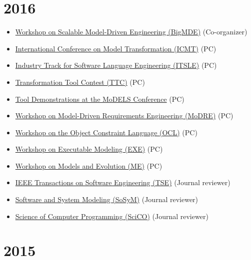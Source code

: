 \hypertarget{section-4}{%
\section{2016}\label{section-4}}

\begin{itemize}
\tightlist
\item
  \href{http://www.big-mde.eu/}{Workshop on Scalable Model-Driven
  Engineering (BigMDE)} (Co-organizer)
\item
  \href{http://is.ieis.tue.nl/research/ICMT16/}{International Conference
  on Model Transformation (ICMT)} (PC)
\item
  \href{http://2016.splashcon.org/track/itsle2016}{Industry Track for
  Software Language Engineering (ITSLE)} (PC)
\item
  \href{http://www.transformation-tool-contest.eu/}{Transformation Tool
  Contest (TTC)} (PC)
\item
  \href{http://models2016.irisa.fr/tool-demonstrations/}{Tool
  Demonstrations at the MoDELS Conference} (PC)
\item
  \href{http://www.modre2016.ece.mcgill.ca/}{Workshop on Model-Driven
  Requirements Engineering (MoDRE)} (PC)
\item
  \href{http://oclworkshop.github.io/2016/news.html}{Workshop on the
  Object Constraint Language (OCL)} (PC)
\item
  \href{http://www.modelexecution.org/?page_id=1743}{Workshop on
  Executable Modeling (EXE)} (PC)
\item
  \href{http://www.models-and-evolution.com/2016/}{Workshop on Models
  and Evolution (ME)} (PC)
\item
  \href{https://www.computer.org/web/tse;jsessionid=6afd856a99689b17c0c58edc329c}{IEEE
  Transactions on Software Engineering (TSE)} (Journal reviewer)
\item
  \href{http://www.sosym.org/}{Software and System Modeling (SoSyM)}
  (Journal reviewer)
\item
  \href{http://www.journals.elsevier.com/science-of-computer-programming/}{Science
  of Computer Programming (SciCO)} (Journal reviewer)
\end{itemize}

\hypertarget{section-5}{%
\section{2015}\label{section-5}}

